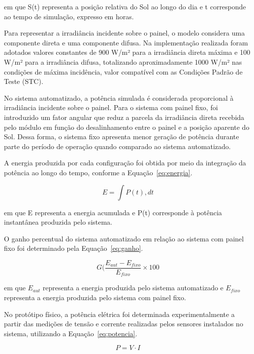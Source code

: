 em que S(t) representa a posição relativa do Sol ao longo do dia e t corresponde ao tempo de simulação, expresso em horas.

Para representar a irradiância incidente sobre o painel, o modelo considera uma componente direta e uma componente difusa. Na implementação realizada foram adotados valores constantes de 900 W/m² para a irradiância direta máxima e 100 W/m² para a irradiância difusa, totalizando aproximadamente 1000 W/m² nas condições de máxima incidência, valor compatível com as Condições Padrão de Teste (STC).

No sistema automatizado, a potência simulada é considerada proporcional à irradiância incidente sobre o painel. Para o sistema com painel fixo, foi introduzido um fator angular que reduz a parcela da irradiância direta recebida pelo módulo em função do desalinhamento entre o painel e a posição aparente do Sol. Dessa forma, o sistema fixo apresenta menor geração de potência durante parte do período de operação quando comparado ao sistema automatizado.

A energia produzida por cada configuração foi obtida por meio da integração da potência ao longo do tempo, conforme a Equação~\ref{eq:energia}.

\begin{equation}
E=\int P(t),dt
\label{eq:energia}
\end{equation}

em que E representa a energia acumulada e P(t) corresponde à potência instantânea produzida pelo sistema.

O ganho percentual do sistema automatizado em relação ao sistema com painel fixo foi determinado pela Equação~\ref{eq:ganho}.

\begin{equation}
G(%
\frac{E_{aut}-E_{fixo}}
{E_{fixo}}
\times100
\label{eq:ganho}
\end{equation}

em que $E_{aut}$ representa a energia produzida pelo sistema automatizado e $E_{fixo}$ representa a energia produzida pelo sistema com painel fixo.

No protótipo físico, a potência elétrica foi determinada experimentalmente a partir das medições de tensão e corrente realizadas pelos sensores instalados no sistema, utilizando a Equação~\ref{eq:potencia}.

\begin{equation}
P=V\cdot I
\label{eq:potencia}
\end{equation}

